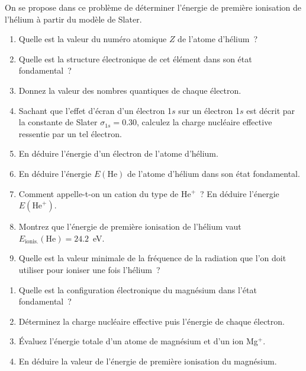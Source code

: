 
On se propose dans ce probl\`eme de d\'eterminer l'\'energie de premi\`ere ionisation de l'h\'elium \`a partir du mod\`ele de Slater.
\begin{enumerate}[\bf 1)]
\item Quelle est la valeur du num\'ero atomique $Z$ de l'atome d'h\'elium~?
\item Quelle est la structure \'electronique de cet \'el\'ement dans son \'etat fondamental~?
\item Donnez la valeur des nombres quantiques de chaque \'electron.
\item Sachant que l'effet d'\'ecran d'un \'electron 1$s$ sur un \'electron 1$s$ est d\'ecrit par la constante de Slater $\sigma_{1s}=0.30$, calculez la charge nucl\'eaire effective ressentie par un tel \'electron. 
\item En d\'eduire l'\'energie d'un \'electron de l'atome d'h\'elium.
\item En d\'eduire l'\'energie $E(\textrm{He})$ de l'atome d'h\'elium dans son \'etat fondamental.
\item Comment appelle-t-on un cation du type de He$^+$~?  En d\'eduire l'\'energie $E(\textrm{He}^+)$.
\item Montrez que l'\'energie de premi\`ere ionisation de l'h\'elium vaut $E_\textrm{ionis.}(\textrm{He})=24.2$~eV.
\item Quelle est la valeur minimale de la fr\'equence de la radiation que l'on doit utiliser pour ioniser 
une fois l'h\'elium~? 
\end{enumerate}
\begin{enumerate}[\bf 1)]
\item Quelle est la configuration \'electronique du magn\'esium dans l'\'etat fondamental~?
\item D\'eterminez la charge nucl\'eaire effective puis l'\'energie de chaque \'electron.
\item \'Evaluez l'\'energie totale d'un atome de magn\'esium et d'un ion Mg$^+$.
\item En d\'eduire la valeur de l'\'energie de premi\`ere ionisation du magn\'esium.
\end{enumerate}
